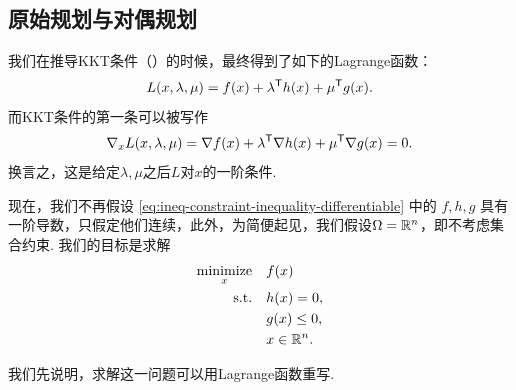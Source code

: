 \subsection{原始规划与对偶规划}

我们在推导KKT条件（）的时候，最终得到了如下的Lagrange函数：
\[L(x,\lambda,\mu)=f(x)+\lambda^{\mathsf{T}} h(x)+\mu^{\mathsf{T}} g(x).\]
而KKT条件的第一条可以被写作
\[\nabla_x L(x,\lambda,\mu)=\nabla f(x)+\lambda^{\mathsf{T}} \nabla h(x)+\mu^{\mathsf{T}} \nabla g(x)=0.\]
换言之，这是给定$\lambda,\mu$之后$L$对$x$的一阶条件. 

现在，我们不再假设 \eqref{eq:ineq-constraint-inequality-differentiable} 中的 $f,h,g$ 具有一阶导数，只假定他们连续，此外，为简便起见，我们假设$\Omega=\mathbb{R}^n$，即不考虑集合约束. 我们的目标是求解
\begin{equation}
\begin{aligned}
    \operatorname*{minimize}_x\quad& f(x) \\
    \text{s.t.}\quad& h(x)=0,\\
    & g(x)\leq 0, \\
    & x \in \mathbb{R}^n.
\end{aligned}\label{eq:non-differentiable-constraint}
\end{equation}

我们先说明，求解这一问题可以用Lagrange函数重写. 

